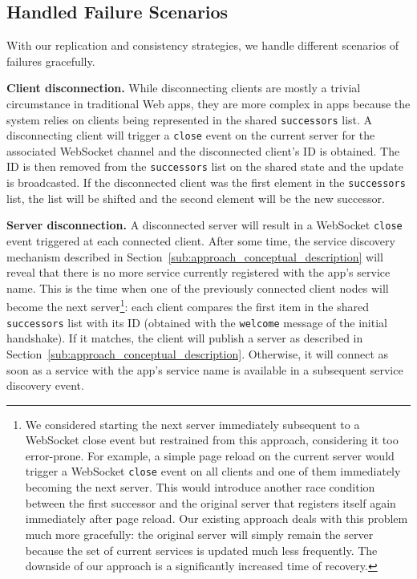 \subsection{Handled Failure Scenarios}
\label{sub:approach_handled_failure_scenarios}

With our replication and consistency strategies, we handle different scenarios of failures gracefully.

\textbf{Client disconnection.} 
While disconnecting clients are mostly a trivial circumstance in traditional Web apps, they are more complex in \APIshort apps because the system relies on clients being represented in the shared \texttt{successors} list. 
A disconnecting client will trigger a \texttt{close} event on the current server for the associated WebSocket channel and the disconnected client's ID is obtained. 
The ID is then removed from the \texttt{successors} list on the shared state and the update is broadcasted. 
If the disconnected client was the first element in the \texttt{successors} list, the list will be shifted and the second element will be the new successor.

\textbf{Server disconnection.} 
A disconnected server will result in a WebSocket \texttt{close} event triggered at each connected client. 
After some time, the service discovery mechanism described in Section~\ref{sub:approach_conceptual_description} will reveal that there is no more service currently registered with the app's service name. 
This is the time when one of the previously connected client nodes will become the next server\footnote{We considered starting the next server immediately subsequent to a WebSocket close event but restrained from this approach, considering it too error-prone. For example, a simple page reload on the current server would trigger a WebSocket \texttt{close} event on all clients and one of them immediately becoming the next server. This would introduce another race condition between the first successor and the original server that registers itself again immediately after page reload. Our existing approach deals with this problem much more gracefully: the original server will simply remain the server because the set of current services is updated much less frequently. The downside of our approach is a significantly increased time of recovery.}: each client compares the first item in the shared \texttt{successors} list with its ID (obtained with the \texttt{welcome} message of the initial handshake). 
If it matches, the client will publish a server as described in Section~\ref{sub:approach_conceptual_description}. 
Otherwise, it will connect as soon as a service with the app's service name is available in a subsequent service discovery event.

